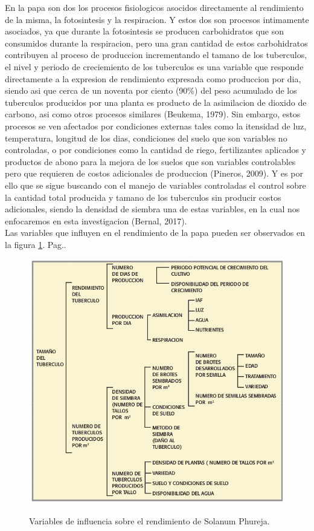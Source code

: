 En la papa son dos los procesos fisiologicos asocidos directamente al rendimiento de la misma, la fotosintesis y la respiracion. Y estos dos son procesos intimamente asociados, ya que durante la fotosintesis se producen carbohidratos que son consumidos durante la respiracion, pero una gran cantidad de estos carbohidratos contribuyen al proceso de produccion incrementando el tamano de los tuberculos, el nivel y periodo de creciemiento de los tuberculos es una variable que responde directamente a la expresion de rendimiento expresada como produccion por dia, siendo asi que cerca de un noventa por ciento (90\%) del peso acumulado de los tuberculos producidos por una planta es producto de la asimilacion de dioxido de carbono, asi como otros procesos similares (Beukema, 1979). Sin embargo, estos procesos se ven afectados por condiciones externas tales como la itensidad de luz, temperatura, longitud de los dias, condiciones del suelo que son variables no controladas, o por condiciones como la cantidad de riego, fertilizantes aplicados y productos de abono para la mejora de los suelos que son variables controlables pero que requieren de costos adicionales de produccion (Pineros, 2009). Y es por ello que se sigue buscando con el manejo de variables controladas el control sobre la cantidad total producida y tamano de los tuberculos sin producir costos adicionales, siendo la densidad de siembra una de estas variables, en la cual nos enfocaremos en esta investigacion (Bernal, 2017).\\

Las variables que influyen en el rendimiento de la papa pueden ser observados en la figura \ref{fig:arch}. Pag.\pageref{fig:arch}.\\
\begin{figure}[h]
	\caption{Variables de influencia sobre el rendimiento de Solanum Phureja.}
	\centering
	\includegraphics[scale=0.5]{variables.png}
	\label{fig:arch}
\end{figure}

